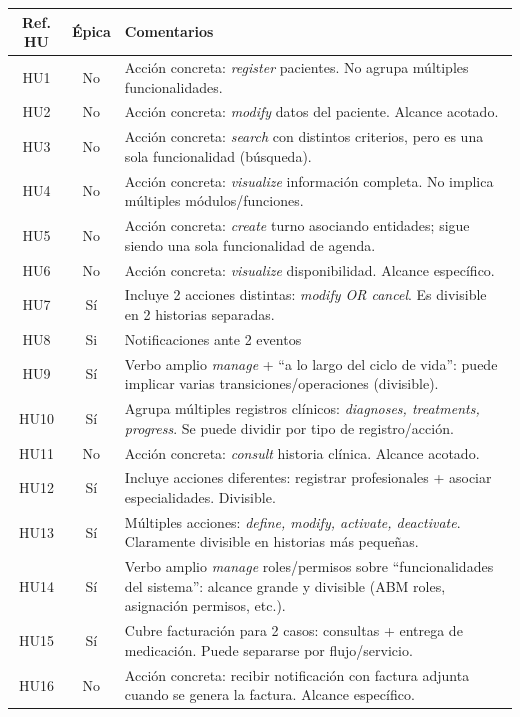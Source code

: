 \begin{longtable}{|c|c|p{6cm}|}
\hline
\textbf{Ref. HU} & \textbf{Épica} & \textbf{Comentarios} \\
\hline
HU1  & No & Acción concreta: \textit{register} pacientes. No agrupa múltiples funcionalidades. \\
\hline
HU2  & No & Acción concreta: \textit{modify} datos del paciente. Alcance acotado. \\
\hline
HU3  & No & Acción concreta: \textit{search} con distintos criterios, pero es una sola funcionalidad (búsqueda). \\
\hline
HU4  & No & Acción concreta: \textit{visualize} información completa. No implica múltiples módulos/funciones. \\
\hline
HU5  & No & Acción concreta: \textit{create} turno asociando entidades; sigue siendo una sola funcionalidad de agenda. \\
\hline
HU6  & No & Acción concreta: \textit{visualize} disponibilidad. Alcance específico. \\
\hline
HU7  & Sí & Incluye 2 acciones distintas: \textit{modify OR cancel}. Es divisible en 2 historias separadas. \\
\hline
HU8  & Si & Notificaciones ante 2 eventos \\
\hline
HU9  & Sí & Verbo amplio \textit{manage} + “a lo largo del ciclo de vida”: puede implicar varias transiciones/operaciones (divisible). \\
\hline
HU10 & Sí & Agrupa múltiples registros clínicos: \textit{diagnoses, treatments, progress}. Se puede dividir por tipo de registro/acción. \\
\hline
HU11 & No & Acción concreta: \textit{consult} historia clínica. Alcance acotado. \\
\hline
HU12 & Sí & Incluye acciones diferentes: registrar profesionales + asociar especialidades. Divisible. \\
\hline
HU13 & Sí & Múltiples acciones: \textit{define, modify, activate, deactivate}. Claramente divisible en historias más pequeñas. \\
\hline
HU14 & Sí & Verbo amplio \textit{manage} roles/permisos sobre “funcionalidades del sistema”: alcance grande y divisible (ABM roles, asignación permisos, etc.). \\
\hline
HU15 & Sí & Cubre facturación para 2 casos: consultas + entrega de medicación. Puede separarse por flujo/servicio. \\
\hline
HU16 & No & Acción concreta: recibir notificación con factura adjunta cuando se genera la factura. Alcance específico. \\

\end{longtable}
